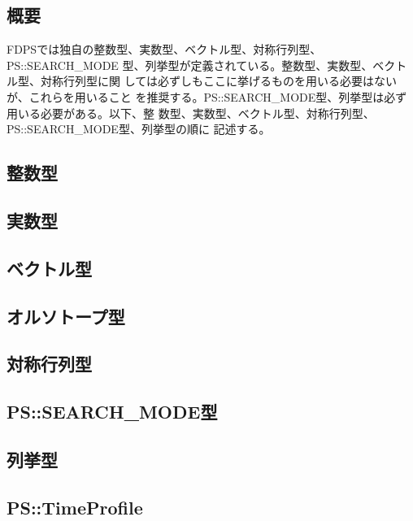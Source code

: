 \subsection{概要}

FDPSでは独自の整数型、実数型、ベクトル型、対称行列型、PS::SEARCH\_MODE
型、列挙型が定義されている。整数型、実数型、ベクトル型、対称行列型に関
しては必ずしもここに挙げるものを用いる必要はないが、これらを用いること
を推奨する。PS::SEARCH\_MODE型、列挙型は必ず用いる必要がある。以下、整
数型、実数型、ベクトル型、対称行列型、PS::SEARCH\_MODE型、列挙型の順に
記述する。

\subsection{整数型}



\subsection{実数型}



\subsection{ベクトル型}


\label{sec:datatype_vector}

\subsection{オルソトープ型}


\label{sec:datatype_orthotope}


\subsection{対称行列型}



\subsection{PS::SEARCH\_MODE型}



\subsection{列挙型}
\label{sec:datatype_enum}



\subsection{PS::TimeProfile}
\label{sec:datatype_timeprofile}





